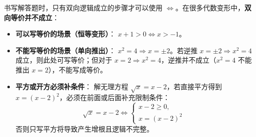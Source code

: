\documentclass[11pt,a4paper]{ctexart}
\begin{document}
\begin{tcolorbox}[
  enhanced,
  colback=white,
  colframe=black,
  boxrule=0.8pt,
  arc=0pt,
  left=8pt, right=8pt, top=6pt, bottom=6pt,
  title={\small\bfseries 【提示】谨慎使用等价符号（\(\Leftrightarrow\)）}
]
  {\small
  书写解答题时，只有双向逻辑成立的步骤才可以使用 \(\Leftrightarrow\)。在很多代数变形中，\textbf{双向等价并不成立}：
  \begin{itemize}[leftmargin=1.5em, itemsep=0.1em, topsep=0.2em]
    \item \textbf{可以写等价的场景（恒等变形）}：
      \(x + 1 > 0 \Leftrightarrow x > -1\)。
    \item \textbf{不能写等价的场景（单向推出）}：
      \(x^2 = 4 \Rightarrow x = \pm 2\)。若逆推 \(x = \pm 2 \Rightarrow x^2=4\) 成立，则此处可写等价；但对于 \(x = 2 \Rightarrow x^2=4\)，逆推并不成立（\(x^2=4\) 不能推出 \(x=2\)），不能写成等价。
    \item \textbf{平方或开方必须补条件}：
      解无理方程 \(\sqrt{x} = x - 2\)，若直接平方得到 \(x = (x-2)^2\)，必须在前面或后面补充限制条件：
      \[
        \sqrt{x} = x - 2 \Leftrightarrow \begin{cases} x - 2 \ge 0, \\ x = (x-2)^2 \end{cases}
      \]
      否则只写平方将导致产生增根且逻辑不完整。
  \end{itemize}
  }
\end{tcolorbox}
\end{document}
